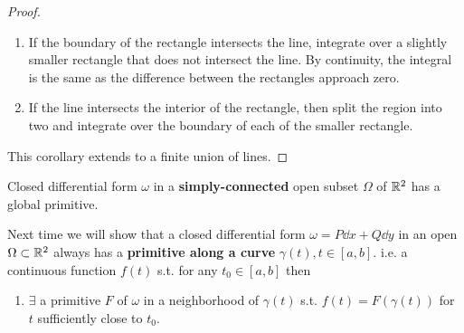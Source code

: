 \documentclass[a4paper,12pt]{article}
\begin{document}
\begin{theorem}[Cauchy]
\begin{corollary}
\begin{proof}
\begin{enumerate}
                \item If the boundary of the rectangle intersects the line, integrate over a slightly smaller rectangle that does not intersect the line. By continuity, the integral is the same as the difference between the rectangles approach zero.
                \item If the line intersects the interior of the rectangle, then split the region into two and integrate over the boundary of each of the smaller rectangle.
            \end{enumerate}
            This corollary extends to a finite union of lines.
        \end{proof}
    \end{corollary}
\end{theorem}
\begin{theorem}
    Closed differential form $\omega$ in a \textbf{simply-connected} open subset $\Omega$ of $\mathbb{R}^2$ has a global primitive.
\end{theorem}
Next time we will show that a closed differential form $\omega=P\dd x+Q\dd y$ in an open $\Omega\subset\mathbb{R}^2$ always has a \textbf{primitive along a curve} $\gamma(t),t\in[a,b].$ i.e. a continuous function $f(t)$ s.t. for any $t_0\in[a,b]$ then \begin{enumerate}
    \item $\exists$ a primitive $F$ of $\omega$ in a neighborhood of $\gamma(t)$ s.t. $f(t)=F(\gamma(t))$ for $t$ sufficiently close to $t_0.$
\end{enumerate}
\end{document}
